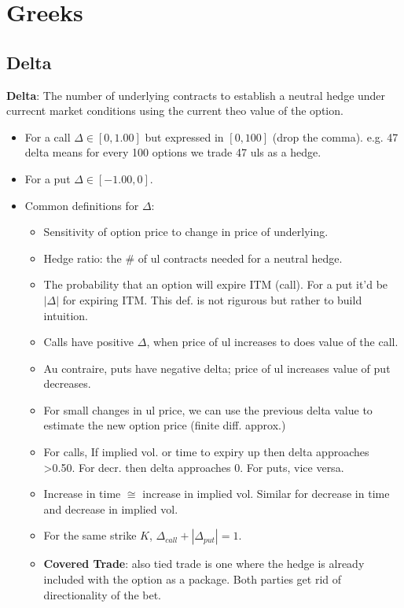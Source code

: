 \documentclass{article}
\begin{document}
\section{Greeks}
\subsection{Delta}
\textbf{Delta}: The number of underlying contracts to establish a neutral hedge
under currecnt market conditions using the current theo value of the option.

\begin{itemize}
    \item For a call $\Delta \in [0, 1.00]$ but expressed in $[0,100]$ (drop the comma).
    e.g. 47 delta means for every 100 options we trade 47 uls as a hedge.
    \item For a put $\Delta \in [-1.00, 0]$.
    \item Common definitions for $\Delta$:
    \begin{itemize}
        \item Sensitivity of option price to change in price of underlying.
        \item Hedge ratio: the \# of ul contracts needed for a neutral hedge.
        \item The probability that an option will expire ITM (call). For a put
        it'd be $|\Delta|$ for expiring ITM. This def. is not rigurous but
        rather to build intuition.
        \item Calls have positive $\Delta$, when price of ul increases to does
        value of the call.
        \item Au contraire, puts have negative delta; price of ul increases
        value of put decreases.
        \item For small changes in ul price, we can use the previous delta value
        to estimate the new option price (finite diff. approx.)
        \item  For calls, If implied vol. or time to expiry up then delta
        approaches
         >0.50. For decr. then delta approaches 0. For puts, vice versa.
        \item Increase in time $\cong$ increase in implied vol. Similar for
        decrease in time and decrease in implied vol.
        \item For the same strike $K$, $\Delta_{call} + |\Delta_{put}| = 1$.
        \item \textbf{Covered Trade}: also tied trade is one where the hedge is
        already included with the option as a package. Both parties get rid of
        directionality of the bet.
    \end{itemize}
\end{itemize}
\end{document}
